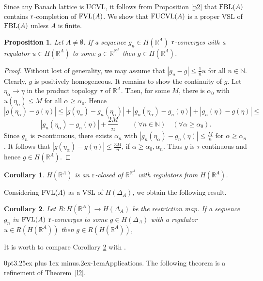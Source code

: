 \documentclass[12pt]{article}
\makeatletter
\newtheorem{prop}{Proposition}
\newtheorem{cor}{Corollary}
\renewcommand{\le}{\leqslant}
\renewcommand{\ge}{\geqslant}
\newcommand{\R}{\mathbb{R}}
\newcommand{\N}{\mathbb{N}}
\renewcommand{\subsection}{\@startsection{subsection}{1}
{0pt}{3.25ex plus 1ex minus.2ex}{-1em}{\normalfont\normalsize\bf}}
\makeatother
\begin{document}
Since any Banach lattice is UCVL, it follows from Proposition \ref{p2} 
that $\text{\rm FBL}(A)$ contains $\text{\rm r}$-completion of $\text{\rm FVL}(A)$. 
We show that $\text{\rm FUCVL}(A)$ is a proper VSL 
of $\text{\rm FBL}(A)$ unless $A$ is finite. 

\begin{prop}\label{p3}
Let $A\ne\emptyset$. 
If a sequence $g_n \in H(\R^A)$  $\text{\rm r}$-converges with a regulator  
$u \in H(\R^A)$ to some  $g \in \R^{\R^A}$ then $g \in H(\R^A)$. 
\end{prop}

\begin{proof}
Without lost of generality, we may assume that $|g_n - g| \le \frac{1}{n} u$ for all $n\in \N$. 
Clearly, $g$ is positively homogeneous. It remains to show the continuity of $g$. 
Let $\eta_\alpha \to \eta$  in the product topology $\tau$ of $\R^A$. 
Then, for some $M$, there is $\alpha_0$ with $u(\eta_\alpha) \le M$  
for all $\alpha \ge \alpha_0$. Hence
$$
  |g(\eta_\alpha) - g(\eta)| \le |g(\eta_\alpha) -g_n(\eta_\alpha) |+ 
  |g_n(\eta_\alpha) -g_n(\eta) |+ |g_n(\eta) - g(\eta)|\le 
$$
$$
   |g_n(\eta_\alpha) -g_n(\eta) |+\frac{2M}{n}  
  \quad\quad  (\forall n\in \N) \quad (\forall \alpha \ge \alpha_0).
$$
Since $g_n$ is $\tau$-continuous, 
there exists $\alpha_n$ with $|g_n(\eta_\alpha) -g_n(\eta) |\le \frac{M}{n}$ 
for $\alpha \ge \alpha_n$. 
It follows that $|g(\eta_\alpha) - g(\eta)| \le \frac{3M}{n}$, 
if $\alpha \ge \alpha_0, \alpha_n$. Thus $g$ is $\tau$-continuous and hence $g \in H(\R^A)$.
\end{proof}

\begin{cor}\label{new}
$H(\R^A)$ is an $\text{\rm r}$-closed  of $\R^{\R^A}$ 
with regulators from $H(\R^A)$.
\end{cor}

Considering $\text{\rm FVL}(A)$ as a VSL of $H(\Delta_A)$, 
we obtain the following result.

\begin{cor}\label{duble}
Let $R: H(\R^A)\to H(\Delta_A)$ be the restriction map.
If a sequence $g_n$ in $\text{\rm FVL}(A)$  $\text{\rm r}$-converges 
to some $g\in H(\Delta_A)$ with a regulator $u\in R(H(\R^A))$ then 
$g \in R(H(\R^A))$,  
\end{cor}

It is worth to compare Corollary \ref{duble} with  \cite[Example~5.2]{PW}. 

\subsection{Applications.}
The following theorem is a refinement of Theorem~\ref{l2}.
\end{document}

